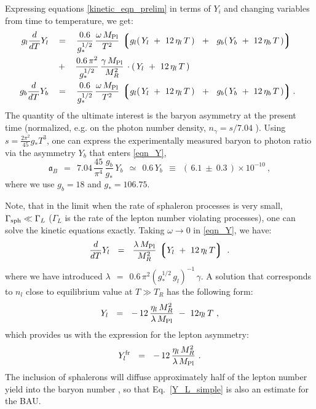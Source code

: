 \documentclass[12pt]{revtex4}
\newcommand{\lgr}{\left\lgroup}
\newcommand{\rgr}{\right\rgroup}
\newcommand{\Mpl}{M_{\rm Pl}}
\newcommand{\Gsph}{\Gamma_{\rm sph}}
\begin{document}
	Expressing equations \eqref{kinetic_eqn_prelim} in terms of
	$ Y_i $ and changing variables from time to temperature, we get:
\begin{equation}
\label{eqn_Y}
\begin{split}
	g_l \frac{d}{dT}Y_l 
	& ~~\;=~~\;
	\frac{0.6}{g_*^{1/2}}\, 
	\frac{\omega\,\Mpl}{T^2}\,
	\lgr g_l (\,Y_l~+~12\,\eta_l\,T\,) ~~+~~ 
	     g_b (\,Y_b~+~12\,\eta_b\,T\,)  \rgr 
	\;~~%
	\\
	& \;~~+~~\;  
	\frac{0.6\,\pi^2}{g_*^{1/2}}\, 
	\frac{\gamma\,\Mpl}{M_R^2}\,
	\cdot (\, Y_l ~+~ 12\,\eta_l\,T\,)\\
	g_b \frac{d}{dT}Y_b 
	& ~~\;=~~\;
	\frac{0.6}{g_*^{1/2}}\, 
	\frac{\omega\,\Mpl}{T^2}\,
	\lgr g_l (\,Y_l~+~12\,\eta_l\,T\,) ~~+~~ 
	     g_b (\,Y_b~+~12\,\eta_b\,T\,)  \rgr .
\end{split}
\end{equation}
	The quantity of the ultimate interest is the baryon asymmetry 
	at the present time (normalized, e.g. on the photon number density,
	$ n_\gamma = s / 7.04 $ \cite{Kolb:1990vq}). 
	Using $ s = \frac{2\pi^2}{45} g_* T^3 $, one can express the experimentally measured 
	baryon to photon ratio via the asymmetry $Y_{b}$ that enters \eqref{eqn_Y},
\begin{equation}
\label{def_asy}
	\mathfrak{a}_B ~~=~~ 7.04\, \frac{45}{\pi^4}\, \frac{g_b}{g_*}\, Y_b
	~~\simeq~~ 0.6 \, Y_b 
		~~\equiv~~ (\, 6.1 ~\pm~ 0.3 \,)\times 10^{-10}~,
\end{equation}
where we  use $ g_b = 18 $ and $g_* = 106.75 $. 

	Note, that in the limit when the rate of sphaleron processes
	is very small, $ \Gsph \ll \Gamma_L $ ($ \Gamma_L $ is the rate
	of the lepton number violating processes), one can solve the kinetic equations
	exactly. 
	Taking $ \omega \to 0 $ in \eqref{eqn_Y}, we have:
\begin{equation}
\label{btz_simple}
	\frac{d}{dT}Y_l ~~=~~ \frac{\lambda\,\Mpl}{M_R^2} \,
			\lgr Y_l ~+~ 12\,\eta_l\, T \rgr~.
\end{equation}
	where we have introduced $
	\lambda ~~=~~ 0.6\, \pi^2
    		         (g_*^{1/2}\, g_l)^{-1}\,\gamma$. 
A solution that corresponds to $n_l$ close to equilibrium value at $T\gg T_R$ has the following form:
\begin{equation}
\label{btz_sol_simple}
	Y_l ~~=~~ -\,12\,\frac{\eta_l\,M_R^2}{\lambda\,\Mpl}
		~-~ 12\eta_l\,T ~,
\end{equation}
	which provides us with the expression for the lepton asymmetry:
\begin{equation}
\label{Y_L_simple}
	Y_l^{\rm fr} ~~=~~ -\, 12\,\frac{\eta_l\,M_R^2}{\lambda\,\Mpl}~.
\end{equation}
	The inclusion of sphalerons will diffuse approximately
	half of the lepton number yield into the baryon number
\cite{Kuzmin:1985mm}, so that Eq.~\eqref{Y_L_simple} is also an estimate for the BAU.
	
\end{document}
